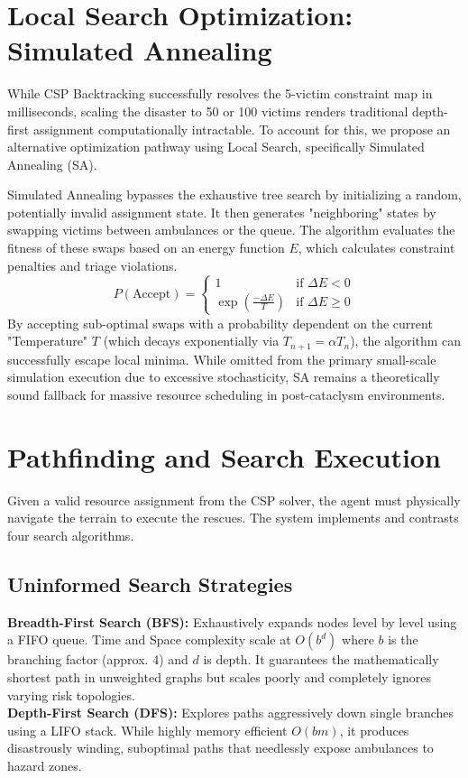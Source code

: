 \documentclass[conference]{IEEEtran}
\begin{document}
\section{Local Search Optimization: Simulated Annealing}
While CSP Backtracking successfully resolves the 5-victim constraint map in milliseconds, scaling the disaster to 50 or 100 victims renders traditional depth-first assignment computationally intractable. To account for this, we propose an alternative optimization pathway using Local Search, specifically Simulated Annealing (SA).

Simulated Annealing bypasses the exhaustive tree search by initializing a random, potentially invalid assignment state. It then generates "neighboring" states by swapping victims between ambulances or the queue. The algorithm evaluates the fitness of these swaps based on an energy function $E$, which calculates constraint penalties and triage violations.
\begin{equation}
    P(\text{Accept}) = 
    \begin{cases} 
      1 & \text{if } \Delta E < 0 \\
      \exp \left( \frac{-\Delta E}{T} \right) & \text{if } \Delta E \geq 0
   \end{cases}
\end{equation}
By accepting sub-optimal swaps with a probability dependent on the current "Temperature" $T$ (which decays exponentially via $T_{n+1} = \alpha T_n$), the algorithm can successfully escape local minima. While omitted from the primary small-scale simulation execution due to excessive stochasticity, SA remains a theoretically sound fallback for massive resource scheduling in post-cataclysm environments.

\section{Pathfinding and Search Execution}

Given a valid resource assignment from the CSP solver, the agent must physically navigate the terrain to execute the rescues. The system implements and contrasts four search algorithms. 

\subsection{Uninformed Search Strategies}
\textbf{Breadth-First Search (BFS):} Exhaustively expands nodes level by level using a FIFO queue. Time and Space complexity scale at $O(b^d)$ where $b$ is the branching factor (approx. 4) and $d$ is depth. It guarantees the mathematically shortest path in unweighted graphs but scales poorly and completely ignores varying risk topologies. \\
\textbf{Depth-First Search (DFS):} Explores paths aggressively down single branches using a LIFO stack. While highly memory efficient $O(bm)$, it produces disastrously winding, suboptimal paths that needlessly expose ambulances to hazard zones.
\end{document}
